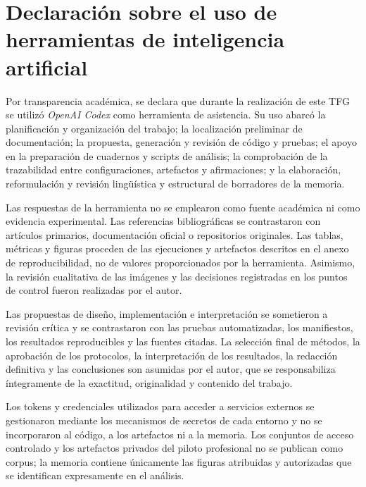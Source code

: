\chapter{Declaración sobre el uso de herramientas de inteligencia artificial}
\label{app:uso-ia}

Por transparencia académica, se declara que durante la realización de este TFG se utilizó
\emph{OpenAI Codex} como herramienta de asistencia. Su uso abarcó la planificación y organización
del trabajo; la localización preliminar de documentación; la propuesta, generación y revisión de
código y pruebas; el apoyo en la preparación de cuadernos y scripts de análisis; la comprobación de
la trazabilidad entre configuraciones, artefactos y afirmaciones; y la elaboración, reformulación y
revisión lingüística y estructural de borradores de la memoria.

Las respuestas de la herramienta no se emplearon como fuente académica ni como evidencia
experimental. Las referencias bibliográficas se contrastaron con artículos primarios,
documentación oficial o repositorios originales. Las tablas, métricas y figuras proceden de las
ejecuciones y artefactos descritos en el anexo de reproducibilidad, no de valores proporcionados por
la herramienta. Asimismo, la revisión cualitativa de las imágenes y las decisiones registradas en
los puntos de control fueron realizadas por el autor.

Las propuestas de diseño, implementación e interpretación se sometieron a revisión crítica y se
contrastaron con las pruebas automatizadas, los manifiestos, los resultados reproducibles y las
fuentes citadas. La selección final de métodos, la aprobación de los protocolos, la interpretación
de los resultados, la redacción definitiva y las conclusiones son asumidas por el autor, que se
responsabiliza íntegramente de la exactitud, originalidad y contenido del trabajo.

Los tokens y credenciales utilizados para acceder a servicios externos se gestionaron mediante los
mecanismos de secretos de cada entorno y no se incorporaron al código, a los artefactos ni a la
memoria. Los conjuntos de acceso controlado y los artefactos privados del piloto profesional no se
publican como corpus; la memoria contiene únicamente las figuras atribuidas y autorizadas que se
identifican expresamente en el análisis.
